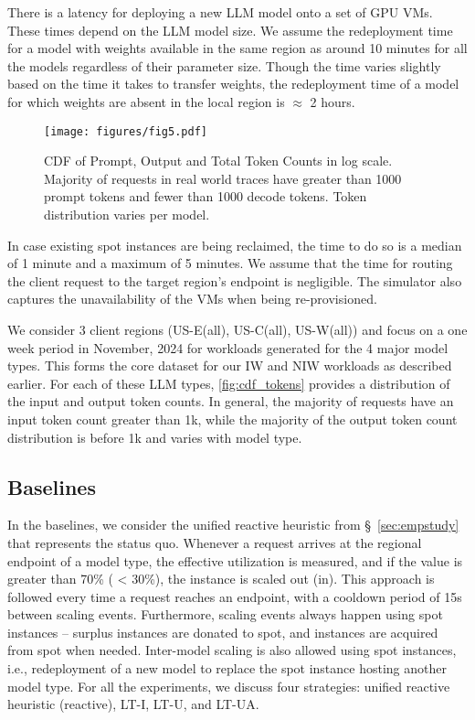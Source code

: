 There is a latency for deploying a new LLM model onto a set of GPU VMs. These times depend on the LLM model size. We assume the redeployment time for a model with weights  available in the same region as around 10 minutes for all the models regardless of their parameter size. Though the time varies slightly based on the time it takes to transfer weights, the redeployment time of a model for which weights are absent in the local region is $\approx$ 2 hours. 

\begin{figure}[t]
    \centering
\texttt{[image: figures/fig5.pdf]}
    \caption{CDF of Prompt, Output and Total Token Counts in log scale. Majority of requests in real world traces have greater than 1000 prompt tokens and fewer than 1000 decode tokens. Token distribution varies per model.}
    \label{fig:cdf_tokens}
\end{figure}

In case existing spot instances are being reclaimed, the time to do so is a median of 1 minute and a maximum of 5 minutes. We assume that the time for routing the client request to the target region's endpoint is negligible. The simulator also captures the unavailability of the VMs when being re-provisioned.

 We consider 3 client regions (US-E(all), US-C(all), US-W(all)) and focus on a one week period in November, 2024 for workloads generated for the 4 major model types.  This forms the core dataset for our IW and NIW workloads as described earlier. For each of these LLM types, \autoref{fig:cdf_tokens} provides a distribution of the input and output token counts. In general, the majority of requests have an input token count greater than 1k, while the majority of the output token count distribution is before 1k and varies with model type.

\subsection{Baselines}
\label{sec:results:base}
In the baselines, we consider the unified reactive heuristic from \S~\ref{sec:empstudy} that represents the status quo. Whenever a request arrives at the regional endpoint of a model type, the effective utilization is measured, and if the value is greater than 70\% ( < 30\%), the instance is scaled out (in). This approach is followed every time a request reaches an endpoint, with a cooldown period of 15s between scaling events. Furthermore, scaling events always happen using spot instances -- surplus instances are donated to spot, and instances are acquired from spot when needed. Inter-model scaling is also allowed using spot instances, i.e., redeployment of a new model to replace the spot instance hosting another model type. For all the experiments, we discuss four strategies: unified reactive heuristic (reactive), LT-I, LT-U, and LT-UA.

